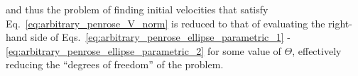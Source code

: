%
and thus the problem of finding initial velocities that satisfy Eq.~\eqref{eq:arbitrary_penrose_V_norm} is reduced to that of evaluating the right-hand side of Eqs.~\eqref{eq:arbitrary_penrose_ellipse_parametric_1} - \eqref{eq:arbitrary_penrose_ellipse_parametric_2} for some value of $\Theta$, effectively reducing the ``degrees of freedom'' of the problem.